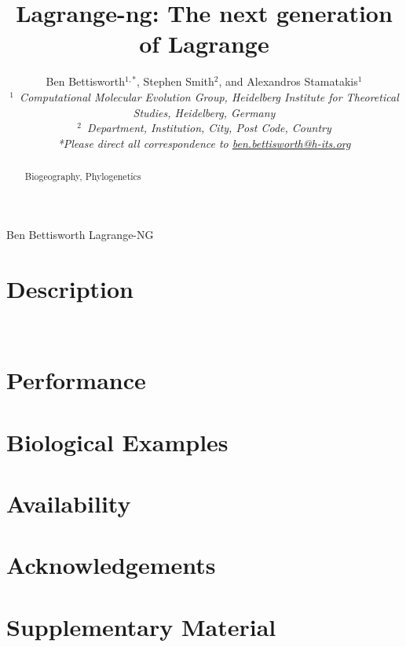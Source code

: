 \documentclass[oupdraft]{sysbio}
\begin{document}
\title{Lagrange-ng: The next generation of Lagrange}

\author{Ben Bettisworth$^{1,\ast}$, Stephen Smith$^{2}$, and
  Alexandros Stamatakis$^{1}$\\[4pt]
  \textit{$^{1}$~Computational Molecular Evolution Group, Heidelberg Institute for Theoretical Studies, Heidelberg,
    Germany}
  \\
  \textit{$^{2}$~Department, Institution, City, Post Code, Country}
  \\[2pt]
  \textit{*Please direct all correspondence to \url{ben.bettisworth@h-its.org}}}

\markboth%
{Ben Bettisworth}
{Lagrange-NG}

\maketitle

\begin{abstract}
  {\lipsum[1]}
  {Biogeography, Phylogenetics}
\end{abstract}
\newline

\lipsum[2-3]

\bigskip
\section{Description}\label{sec:description}

\lipsum[4-6]~\cite{ree_likelihood_2005}

\bigskip
\section{Performance}\label{sec:performance}

\lipsum[5]

\bigskip

\section{Biological Examples}\label{sec:bio-examples}

\lipsum[6]

\bigskip

\section{Availability}\label{sec:availability}

\lipsum[7]

\section{Acknowledgements}

\lipsum[8][1]

\section{Supplementary Material}

\lipsum[8][2]

\bigskip\bigskip



\end{document}
